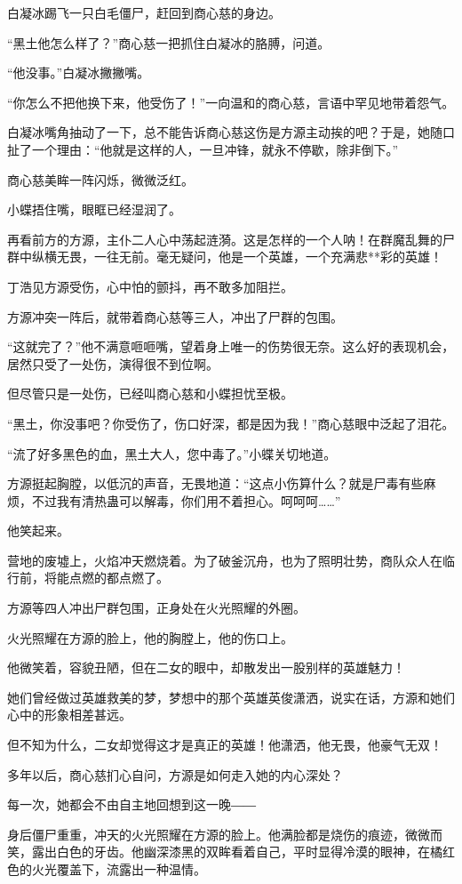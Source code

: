 \begin{this_body}
白凝冰踢飞一只白毛僵尸，赶回到商心慈的身边。

“黑土他怎么样了？”商心慈一把抓住白凝冰的胳膊，问道。

“他没事。”白凝冰撇撇嘴。

“你怎么不把他换下来，他受伤了！”一向温和的商心慈，言语中罕见地带着怨气。

白凝冰嘴角抽动了一下，总不能告诉商心慈这伤是方源主动挨的吧？于是，她随口扯了一个理由：“他就是这样的人，一旦冲锋，就永不停歇，除非倒下。”

商心慈美眸一阵闪烁，微微泛红。

小蝶捂住嘴，眼眶已经湿润了。

再看前方的方源，主仆二人心中荡起涟漪。这是怎样的一个人呐！在群魔乱舞的尸群中纵横无畏，一往无前。毫无疑问，他是一个英雄，一个充满悲**彩的英雄！

丁浩见方源受伤，心中怕的颤抖，再不敢多加阻拦。

方源冲突一阵后，就带着商心慈等三人，冲出了尸群的包围。

“这就完了？”他不满意咂咂嘴，望着身上唯一的伤势很无奈。这么好的表现机会，居然只受了一处伤，演得很不到位啊。

但尽管只是一处伤，已经叫商心慈和小蝶担忧至极。

“黑土，你没事吧？你受伤了，伤口好深，都是因为我！”商心慈眼中泛起了泪花。

“流了好多黑色的血，黑土大人，您中毒了。”小蝶关切地道。

方源挺起胸膛，以低沉的声音，无畏地道：“这点小伤算什么？就是尸毒有些麻烦，不过我有清热蛊可以解毒，你们用不着担心。呵呵呵……”

他笑起来。

营地的废墟上，火焰冲天燃烧着。为了破釜沉舟，也为了照明壮势，商队众人在临行前，将能点燃的都点燃了。

方源等四人冲出尸群包围，正身处在火光照耀的外圈。

火光照耀在方源的脸上，他的胸膛上，他的伤口上。

他微笑着，容貌丑陋，但在二女的眼中，却散发出一股别样的英雄魅力！

她们曾经做过英雄救美的梦，梦想中的那个英雄英俊潇洒，说实在话，方源和她们心中的形象相差甚远。

但不知为什么，二女却觉得这才是真正的英雄！他潇洒，他无畏，他豪气无双！

多年以后，商心慈扪心自问，方源是如何走入她的内心深处？

每一次，她都会不由自主地回想到这一晚――

身后僵尸重重，冲天的火光照耀在方源的脸上。他满脸都是烧伤的痕迹，微微而笑，露出白色的牙齿。他幽深漆黑的双眸看着自己，平时显得冷漠的眼神，在橘红色的火光覆盖下，流露出一种温情。


\end{this_body}
